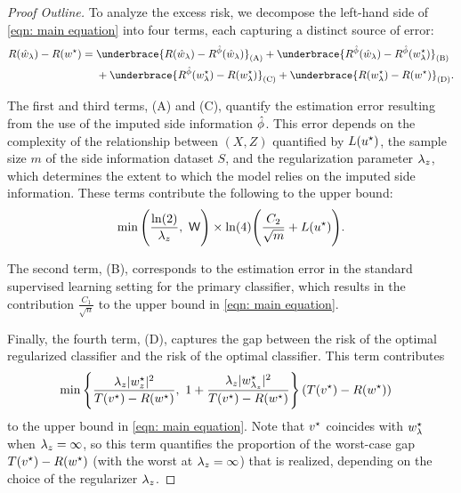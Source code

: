 \begin{proof}[Proof Outline]
To analyze the excess risk, we decompose the left-hand side of \eqref{eqn: main equation} into four terms, each capturing a distinct source of error:
\begin{equation*}
\begin{aligned}
    R(\whl) - R(\ws) =\;&
    \underbrace{R(\whl) - \rph(\whl)}_{\mathrm{(A)}} +
    \underbrace{\rph(\whl) - \rph(\wsl)}_{\mathrm{(B)}} \\
    &+ \underbrace{\rph(\wsl) - R(\wsl)}_{\mathrm{(C)}} +
    \underbrace{R(\wsl) - R(\ws)}_{\mathrm{(D)}}.
\end{aligned}
\end{equation*}

\noindent The first and third terms, (A) and (C), quantify the estimation error resulting from the use of the imputed side information $\hat{\phi}$. This error depends on the complexity of the relationship between $(X, Z)$ quantified by $L(u^\star)$, the sample size $m$ of the side information dataset $S$, and the regularization parameter $\lambda_z$, which determines the extent to which the model relies on the imputed side information. These terms contribute the following to the
upper bound:
\begin{equation*}
    \min\Bigg( \frac{\ln(2)}{\lambda_z},\ \mathsf{W} \Bigg)
    \times
    \ln(4)\Bigg( \frac{C_2}{\sqrt{m}} + L(u^\star) \Bigg).
\end{equation*}

\noindent The second term, (B), corresponds to the estimation error in the standard supervised learning setting for the primary classifier, which results in the contribution $    \frac{C_1}{\sqrt{n}}$
to the upper bound in \eqref{eqn: main equation}.

\noindent Finally, the fourth term, (D), captures the gap between the risk
of the optimal regularized classifier and the risk of the optimal classifier. This term contributes
\begin{equation*}
\begin{aligned}
    &\min\left\{\frac{\lambda_z |w^\star_z|^2}{T(v^\star) - R(w^\star)},\
    1 + \frac{\lambda_z |w^\star_{\lambda_z}|^2}{T(v^\star) - R(w^\star)}\right\}\left(T(v^\star) - R(w^\star)\right)
\end{aligned}
\end{equation*}
to the upper bound in \eqref{eqn: main equation}.
Note that $v^\star$ coincides with $w^\star_{\lambda}$ when $\lambda_z = \infty$, so this term quantifies the proportion of the worst-case gap $T(v^\star) - R(w^\star)$ (with the worst at $\lambda_z = \infty$) that is realized, depending on the choice of the regularizer $\lambda_z$.
\end{proof}

